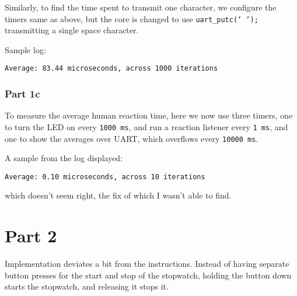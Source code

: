 Similarly, to find the time spent to transmit one character, we configure the timers same as above, but the core is changed to use \texttt{uart\_putc(' ');} transmitting a single space character.

Sample log:
\begin{verbatim}
Average: 83.44 microseconds, across 1000 iterations
\end{verbatim}

\subsubsection*{Part 1c}

To measure the average human reaction time, here we now use three timers, one to turn the LED on every \texttt{1000\,ms}, and run a reaction listener every \texttt{1\,ms}, and one to show the averages over UART, which overflows every \texttt{10000\,ms}.

A sample from the log displayed:
\begin{verbatim}
Average: 0.10 microseconds, across 10 iterations
\end{verbatim}
which doesn't seem right, the fix of which I wasn't able to find.

\section*{Part 2}

Implementation deviates a bit from the instructions.
Instead of having separate button presses for the start and stop of the stopwatch, holding the button down starts the stopwatch, and releasing it stops it.
